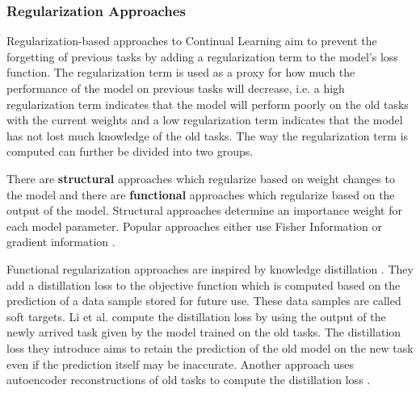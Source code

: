 \subsubsection{Regularization Approaches}
\label{sec:RegularizationApproaches}
Regularization-based approaches to Continual Learning aim to prevent the forgetting of previous tasks by adding a regularization
term to the model's loss function. The regularization term is used as a proxy for how much the performance of the model on previous
tasks will decrease, i.e. a high regularization term indicates that the model will perform poorly on the old tasks with the current
weights and a low regularization term indicates that the model has not lost much knowledge of the old tasks. The way the
regularization term is computed can further be divided into two groups. \par
There are \textbf{structural} approaches which regularize based on weight changes to the model and there are \textbf{functional}
approaches which regularize based on the output of the model. Structural approaches determine an importance weight for each
model parameter. Popular approaches either use Fisher Information \cite{kirkpatrick2017overcoming} \cite{lee2017overcoming} or
gradient information \cite{aljundi2018memory} \cite{zenke2017continual}.\par
Functional regularization approaches are inspired by knowledge distillation \cite{hinton2015distilling}. They add a distillation
loss to the objective function which is computed based on the prediction of a data sample stored for future use. These data samples
are called soft targets. Li et al. \cite{li2017learning} compute the distillation loss by using the output of the newly arrived task
given by the model trained on the old tasks. The distillation loss they introduce aims to retain the prediction of the old model on
the new task even if the prediction itself may be inaccurate. Another approach uses autoencoder reconstructions of old tasks to
compute the distillation loss \cite{rannen2017encoder}.

